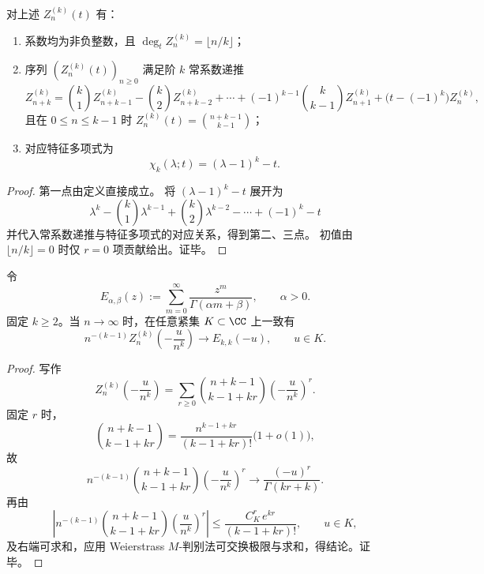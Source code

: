 \begin{theorem}[根单位过滤配分函数的代数结构]\label{thm:pom-kcollision-root-filter-recurrence}
对上述 \(Z_n^{(k)}(t)\) 有：
\begin{enumerate}
\item 系数均为非负整数，且 \(\deg_t Z_n^{(k)}=\lfloor n/k\rfloor\)；
\item 序列 \((Z_n^{(k)}(t))_{n\ge 0}\) 满足阶 \(k\) 常系数递推
\[
Z_{n+k}^{(k)}
=\binom{k}{1}Z_{n+k-1}^{(k)}-\binom{k}{2}Z_{n+k-2}^{(k)}+\cdots+(-1)^{k-1}\binom{k}{k-1}Z_{n+1}^{(k)}
+\bigl(t-(-1)^k\bigr)Z_n^{(k)},
\]
且在 \(0\le n\le k-1\) 时
\(
Z_n^{(k)}(t)=\binom{n+k-1}{k-1}
\)；
\item 对应特征多项式为
\[
\chi_k(\lambda;t)=(\lambda-1)^k-t.
\]
\end{enumerate}
\end{theorem}
\begin{proof}
第一点由定义直接成立。
将 \((\lambda-1)^k-t\) 展开为
\[
\lambda^k-\binom{k}{1}\lambda^{k-1}+\binom{k}{2}\lambda^{k-2}-\cdots+(-1)^k-t
\]
并代入常系数递推与特征多项式的对应关系，得到第二、三点。
初值由 \(\lfloor n/k\rfloor=0\) 时仅 \(r=0\) 项贡献给出。证毕。
\end{proof}

\begin{theorem}\label{thm:pom-kcollision-mittag-leffler-scaling}
令
\[
E_{\alpha,\beta}(z):=\sum_{m=0}^{\infty}\frac{z^m}{\Gamma(\alpha m+\beta)},\qquad \alpha>0.
\]
固定 \(k\ge 2\)。当 \(n\to\infty\) 时，在任意紧集 \(K\subset\CC\) 上一致有
\[
n^{-(k-1)}Z_n^{(k)}\!\left(-\frac{u}{n^k}\right)\longrightarrow E_{k,k}(-u),\qquad u\in K.
\]
\end{theorem}
\begin{proof}
写作
\[
Z_n^{(k)}\!\left(-\frac{u}{n^k}\right)
=\sum_{r\ge 0}\binom{n+k-1}{k-1+kr}\left(-\frac{u}{n^k}\right)^r.
\]
固定 \(r\) 时，
\[
\binom{n+k-1}{k-1+kr}
=\frac{n^{k-1+kr}}{(k-1+kr)!}\bigl(1+o(1)\bigr),
\]
故
\[
n^{-(k-1)}\binom{n+k-1}{k-1+kr}\left(-\frac{u}{n^k}\right)^r
\to \frac{(-u)^r}{\Gamma(kr+k)}.
\]
再由
\[
\left|n^{-(k-1)}\binom{n+k-1}{k-1+kr}\left(\frac{u}{n^k}\right)^r\right|
\le \frac{C_K^r\,e^{kr}}{(k-1+kr)!},\qquad u\in K,
\]
及右端可求和，应用 Weierstrass \(M\)-判别法可交换极限与求和，得结论。证毕。
\end{proof}

